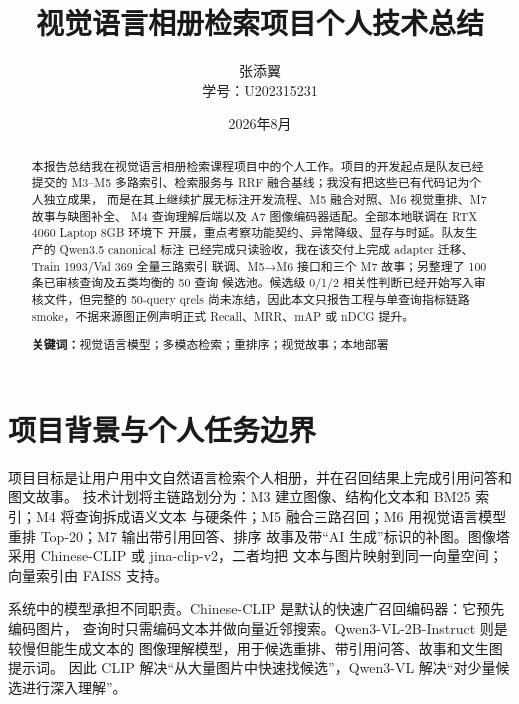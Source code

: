 \documentclass[UTF8,11pt,a4paper]{ctexart}
\title{视觉语言相册检索项目个人技术总结}
\author{张添翼\\学号：U202315231}
\date{2026年8月}
\begin{document}
\pagestyle{plain}
\maketitle

\begin{abstract}
本报告总结我在视觉语言相册检索课程项目中的个人工作。项目的开发起点是队友已经提交的
M3--M5 多路索引、检索服务与 RRF 融合基线；我没有把这些已有代码记为个人独立成果，
而是在其上继续扩展无标注开发流程、M5 融合对照、M6 视觉重排、M7 故事与缺图补全、
M4 查询理解后端以及 A7 图像编码器适配。全部本地联调在 RTX 4060 Laptop 8GB 环境下
开展，重点考察功能契约、异常降级、显存与时延。队友生产的 Qwen3.5 canonical 标注
已经完成只读验收，我在该交付上完成 adapter 迁移、Train 1993/Val 369 全量三路索引
联调、M5→M6 接口和三个 M7 故事；另整理了 100 条已审核查询及五类均衡的 50 查询
候选池。候选级 0/1/2 相关性判断已经开始写入审核文件，但完整的 50-query qrels
尚未冻结，因此本文只报告工程与单查询指标链路 smoke，不据来源图正例声明正式
Recall、MRR、mAP 或 nDCG 提升。

\noindent\textbf{关键词：}视觉语言模型；多模态检索；重排序；视觉故事；本地部署
\end{abstract}

\noindent{}

\section{项目背景与个人任务边界}

项目目标是让用户用中文自然语言检索个人相册，并在召回结果上完成引用问答和图文故事。
技术计划将主链路划分为：M3 建立图像、结构化文本和 BM25 索引；M4 将查询拆成语义文本
与硬条件；M5 融合三路召回；M6 用视觉语言模型重排 Top-20；M7 输出带引用回答、排序
故事及带“AI 生成”标识的补图。图像塔采用 Chinese-CLIP 或 jina-clip-v2，二者均把
文本与图片映射到同一向量空间\citep{chineseclip2022,jinaclipv2}；向量索引由 FAISS
支持\citep{faiss2017}。

系统中的模型承担不同职责。Chinese-CLIP 是默认的快速广召回编码器：它预先编码图片，
查询时只需编码文本并做向量近邻搜索。Qwen3-VL-2B-Instruct 则是较慢但能生成文本的
图像理解模型，用于候选重排、带引用问答、故事和文生图提示词\citep{qwen3vl}。
因此 CLIP 解决“从大量图片中快速找候选”，Qwen3-VL 解决“对少量候选进行深入理解”。
\end{document}
